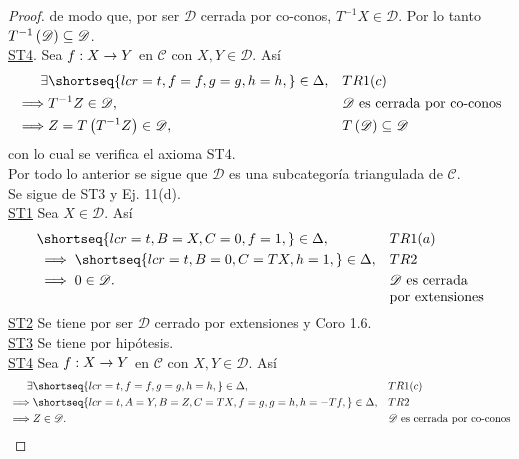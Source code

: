 \documentclass{article}
\begin{document}
\begin{propsn}[Lema 1.12]
\begin{proof}
		de modo que, por ser $\mathscr{D}$ cerrada por co-conos, $T^{-1}X\in\mathscr{D}$. Por lo tanto $T^{-1}\left(\mathscr{D}\right)\subseteq\mathscr{D}$.\\
		\underline{ST4}. Sea $\catarrow{f}{X}{Y}{}$ en $\mathscr{C}$ con $X,Y\in\mathscr{D}$. Así
		\begin{align*}
			\exists&\shortseq{lcr=t,f=f,g=g,h=h,}\in\Delta, && TR1(c)\\
			\implies& T^{-1}Z\in\mathscr{D}, && \mathscr{D}\text{ es cerrada por co-conos}\\
			\implies & Z=T\lrprth{T^{-1}Z}\in\mathscr{D}, && T\lrprth{\mathscr{D}}\subseteq\mathscr{D}
		\end{align*}
		con lo cual se verifica el axioma ST4.\\
		Por todo lo anterior se sigue que $\mathscr{D}$ es una subcategoría triangulada de $\mathscr{C}$.\\
		
		 Se sigue de ST3 y Ej. 11(d).\\
		 \underline{ST1} Sea $X\in \mathscr{D}$. Así
		\begin{align*}
			\phantom{a}&\shortseq{lcr=t,B=X,C=0,f=1,}\in\Delta, && TR1(a)\\
			&\implies\shortseq{lcr=t,B=0,C=TX,h=1,}\in\Delta, && TR2\\
			&\implies 0\in\mathscr{D}. &&\parbox[t]{1in}{\raggedright $\mathscr{D}$ es cerrada por extensiones}
		\end{align*}		
		\underline{ST2} Se tiene por ser $\mathscr{D}$ cerrado por extensiones y Coro 1.6.\\
		\underline{ST3} Se tiene por hipótesis.\\
		\underline{ST4} Sea $\catarrow{f}{X}{Y}{}$ en $\mathscr{C}$ con $X,Y\in\mathscr{D}$. Así
		\begin{align*}
			\exists&\shortseq{lcr=t,f=f,g=g,h=h,}\in\Delta, && TR1(c)\\
			\implies& \shortseq{lcr=t,A=Y,B=Z,C=TX,f=g,g=h,h=-Tf,}\in\Delta, && TR2\\
			\implies & Z\in\mathscr{D}. && \mathscr{D}\text{ es cerrada por co-conos}
		\end{align*}
		\end{proof} 
	\end{propsn}
	
\end{document}
